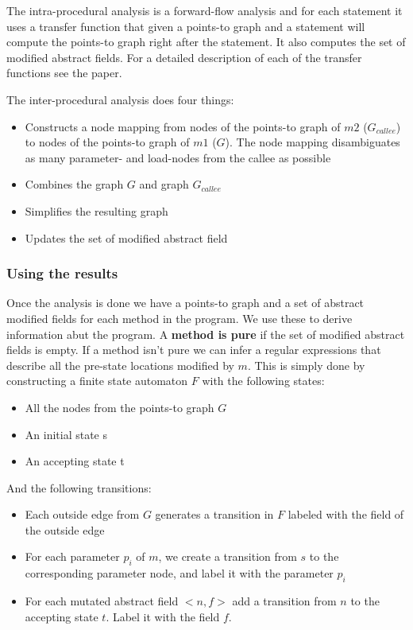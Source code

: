 \documentclass[11pt]{exam}
\begin{document}
The intra-procedural analysis is a forward-flow analysis and for each
statement it uses a transfer function that given a points-to graph and
a statement will compute the points-to graph right after the
statement. It also computes the set of modified abstract fields. For a
detailed description of each of the transfer functions see the paper.
\newline

The inter-procedural analysis does four things:

\begin{itemize}
  \setlength{\itemsep}{1pt}
  \setlength{\parskip}{0pt}
  \item Constructs a node mapping from nodes of the points-to graph of
        $m2$ ($G_{callee}$) to nodes of the points-to graph of
        $m1$ ($G$). The node mapping disambiguates as many parameter-
        and load-nodes from the callee as possible
  \item Combines the graph $G$ and graph $G_{callee}$
  \item Simplifies the resulting graph
  \item Updates the set of modified abstract field
\end{itemize}

\subsubsection*{Using the results}

Once the analysis is done we have a points-to graph and a set of
abstract modified fields for each method in the program. We use these
to derive information abut the program. A \textbf{method is pure} if
the set of modified abstract fields is empty. If a method isn't pure
we can infer a regular expressions that describe all the pre-state
locations modified by $m$. This  is simply done by constructing a
finite state automaton $F$ with the following states:

\begin{itemize}
  \setlength{\itemsep}{1pt}
  \setlength{\parskip}{0pt}
  \item All the nodes from the points-to graph $G$
  \item An initial state s
  \item An accepting state t
\end{itemize}

And the following transitions:

\begin{itemize}
  \setlength{\itemsep}{1pt}
  \setlength{\parskip}{0pt}
  \item Each outside edge from $G$ generates a transition in $F$ labeled with
        the field of the outside edge
  \item For each parameter $p_i$ of $m$, we create a transition from $s$ to
        the corresponding parameter node, and label it with the parameter $p_i$
  \item For each mutated abstract field $<n,f>$ add a transition from $n$ to the
        accepting state $t$. Label it with the field $f$.
\end{itemize}
\end{document}
